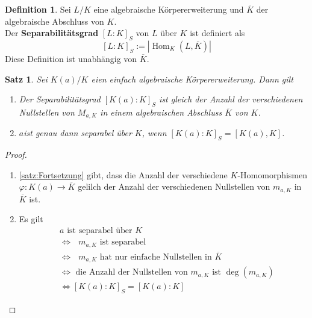 \documentclass[10pt,a4paper]{article}
\newcommand{\ol}[1]{\overline{#1}}
\newcommand{\abs}[1]{\left|#1\right|}
\newcommand{\Hom}{\operatorname{Hom}}
\theoremstyle{plain}
\newtheorem{satz}[theorem]{Satz}
\theoremstyle{definition}
\newtheorem{definition}[theorem]{Definition}
\theoremstyle{remark}
\begin{document}
	\begin{definition}
		Sei $L/K$ eine algebraische Körpererweiterung und $\ol K$ der algebraische Abschluss von $K$.\\
		Der \textbf{Separabilitätsgrad} $[L:K]_S$ von $L$ über $K$ ist definiert als
		\[[L:K]_S:=\abs{\Hom_K(L,\ol K)}\]
		Diese Definition ist unabhängig von $\ol K$.
	\end{definition}

	\begin{satz}
		Sei $K(a)/K$ eien einfach algebraische Körpererweiterung. Dann gilt
		\begin{enumerate}
			\item Der Separabilitätsgrad $[K(a):K]_S$ ist gleich der Anzahl der verschiedenen Nullstellen von $M_{a,K}$ in einem algebraischen Abschluss $\ol K$ von $K$.
			\item $a$ist genau dann separabel über $K$, wenn $[K(a):K]_S=[K(a),K]$.
		\end{enumerate}
	\end{satz}
	\begin{proof}
		\begin{enumerate}
			\item \ref{satz:Fortsetzung} gibt, dass die Anzahl der verschiedene $K$-Homomorphismen $\varphi:K(a)\to\ol K$ gelilch der Anzahl der verschiedenen Nullstellen von $m_{a,K}$ in $\ol K$ ist.
			\item Es gilt
			\begin{align*}
			&\text{$a$ ist separabel über $K$ }\\
			&\Leftrightarrow \text{ $m_{a,K}$ ist separabel }\\
			&\Leftrightarrow\text{ $m_{a,K}$ hat nur einfache Nullstellen in $\ol K$ }\\
			&\Leftrightarrow\text{ die Anzahl der Nullstellen von $m_{a,K}$ ist $\deg(m_{a,K})$}\\
			&\Leftrightarrow [K(a):K]_S=[K(a):K]
			\end{align*}
		\end{enumerate}
	\end{proof}
\end{document}
